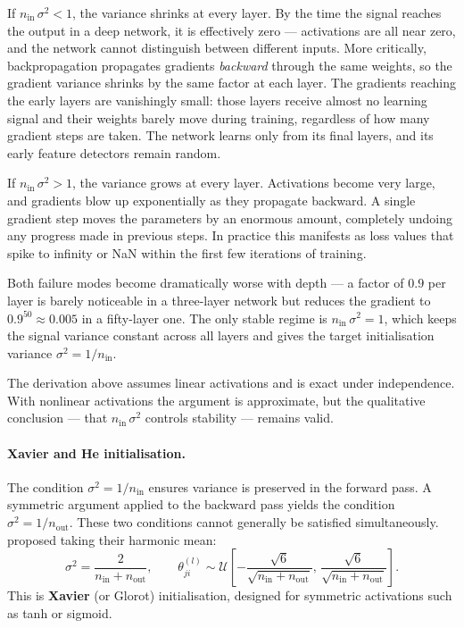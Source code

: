 If $n_{\text{in}}\,\sigma^2 < 1$, the variance shrinks at every layer. By the time the signal reaches the output in a deep network, it is effectively zero — activations are all near zero, and the network cannot distinguish between different inputs. More critically, backpropagation propagates gradients \emph{backward} through the same weights, so the gradient variance shrinks by the same factor at each layer. The gradients reaching the early layers are vanishingly small: those layers receive almost no learning signal and their weights barely move during training, regardless of how many gradient steps are taken. The network learns only from its final layers, and its early feature detectors remain random.

If $n_{\text{in}}\,\sigma^2 > 1$, the variance grows at every layer. Activations become very large, and gradients blow up exponentially as they propagate backward. A single gradient step moves the parameters by an enormous amount, completely undoing any progress made in previous steps. In practice this manifests as loss values that spike to infinity or NaN within the first few iterations of training.

Both failure modes become dramatically worse with depth — a factor of $0.9$ per layer is barely noticeable in a three-layer network but reduces the gradient to $0.9^{50} \approx 0.005$ in a fifty-layer one. The only stable regime is $n_{\text{in}}\,\sigma^2 = 1$, which keeps the signal variance constant across all layers and gives the target initialisation variance $\sigma^2 = 1/n_{\text{in}}$.

\begin{remark}
    The derivation above assumes linear activations and is exact under independence. With nonlinear activations the argument is approximate, but the qualitative conclusion — that $n_{\text{in}}\,\sigma^2$ controls stability — remains valid.
\end{remark}

\paragraph{Xavier and He initialisation.}
The condition $\sigma^2 = 1/n_{\text{in}}$ ensures variance is preserved in the forward pass. A symmetric argument applied to the backward pass yields the condition $\sigma^2 = 1/n_{\text{out}}$. These two conditions cannot generally be satisfied simultaneously. \textcite{glorot2010understanding} proposed taking their harmonic mean:
\begin{equation}
    \sigma^2 = \frac{2}{n_{\text{in}} + n_{\text{out}}},
    \qquad
    \theta^{(l)}_{ji} \sim \mathcal{U}\!\left[-\frac{\sqrt{6}}{\sqrt{n_{\text{in}}+n_{\text{out}}}},\, \frac{\sqrt{6}}{\sqrt{n_{\text{in}}+n_{\text{out}}}}\right].
\end{equation}
This is \textbf{Xavier} (or Glorot) initialisation, designed for symmetric activations such as tanh or sigmoid.

